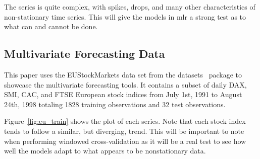 \documentclass[12pt]{article}%
\theoremstyle{definition}
\newcommand{\pkg}[1]{{\fontseries{b}\selectfont #1}}
\begin{document}
The series is quite complex, with spikes, drops, and many other characteristics of non-stationary time series. This will give the models in mlr a strong test as to what can and cannot be done.

\subsection{Multivariate Forecasting Data}
This paper uses the EUStockMarkets data set from the \pkg{datasets}~\cite{datasets} package to showcase the multivariate forecasting tools. It contains a subset of daily DAX, SMI, CAC, and FTSE European stock indices from July 1st, 1991 to August 24th, 1998 totaling 1828 training observations and 32 test observations.

\singlespace
\begin{knitrout}
\color{fgcolor}\begin{kframe}
\begin{alltt}
\hlstd{(}\hlstd{)}
 \hlkwb{=} \hlopt{::}\hlstd{(}
                \hlstd{(}
  \hlkwb{=} \hlopt{::}\hlstd{(}
                            
 \hlkwb{=} \hlstd{EuStockMarkets[}\hlopt{:}\hlstd{,]}
 \hlkwb{=} \hlstd{EuStockMarkets[}\hlopt{:}\hlstd{,]}
\end{alltt}
\end{kframe}
\end{knitrout}



\doublespacing

Figure~\ref{fig:eu_train} shows the plot of each series. Note that each stock index tends to follow a similar, but diverging, trend. This will be important to note when performing windowed cross-validation as it will be a real test to see how well the models adapt to what appears to be nonstationary data.
\end{document}
